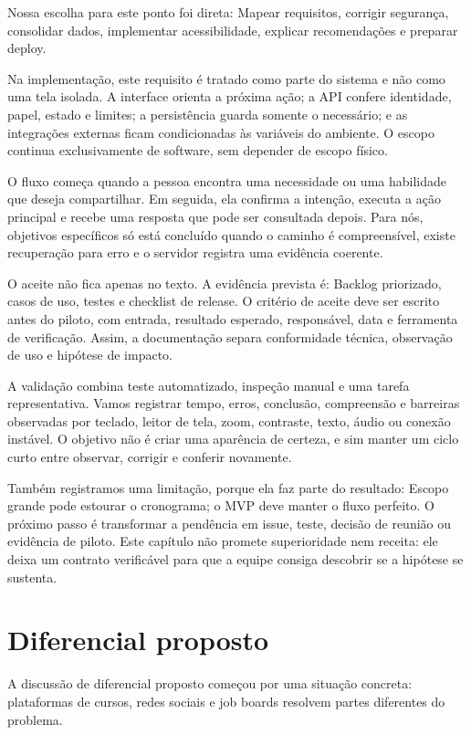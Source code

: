 \documentclass[12pt,oneside,a4paper,article]{abntex2}
\begin{document}
Nossa escolha para este ponto foi direta: Mapear requisitos, corrigir segurança, consolidar dados, implementar acessibilidade, explicar recomendações e preparar deploy.

Na implementação, este requisito é tratado como parte do sistema e não como uma tela isolada. A interface orienta a próxima ação; a API confere identidade, papel, estado e limites; a persistência guarda somente o necessário; e as integrações externas ficam condicionadas às variáveis do ambiente. O escopo continua exclusivamente de software, sem depender de escopo físico.

O fluxo começa quando a pessoa encontra uma necessidade ou uma habilidade que deseja compartilhar. Em seguida, ela confirma a intenção, executa a ação principal e recebe uma resposta que pode ser consultada depois. Para nós, objetivos específicos só está concluído quando o caminho é compreensível, existe recuperação para erro e o servidor registra uma evidência coerente.

O aceite não fica apenas no texto. A evidência prevista é: Backlog priorizado, casos de uso, testes e checklist de release. O critério de aceite deve ser escrito antes do piloto, com entrada, resultado esperado, responsável, data e ferramenta de verificação. Assim, a documentação separa conformidade técnica, observação de uso e hipótese de impacto.

A validação combina teste automatizado, inspeção manual e uma tarefa representativa. Vamos registrar tempo, erros, conclusão, compreensão e barreiras observadas por teclado, leitor de tela, zoom, contraste, texto, áudio ou conexão instável. O objetivo não é criar uma aparência de certeza, e sim manter um ciclo curto entre observar, corrigir e conferir novamente.

Também registramos uma limitação, porque ela faz parte do resultado: Escopo grande pode estourar o cronograma; o MVP deve manter o fluxo perfeito. O próximo passo é transformar a pendência em issue, teste, decisão de reunião ou evidência de piloto. Este capítulo não promete superioridade nem receita: ele deixa um contrato verificável para que a equipe consiga descobrir se a hipótese se sustenta.

\section{Diferencial proposto}
A discussão de diferencial proposto começou por uma situação concreta: plataformas de cursos, redes sociais e job boards resolvem partes diferentes do problema.
\end{document}
